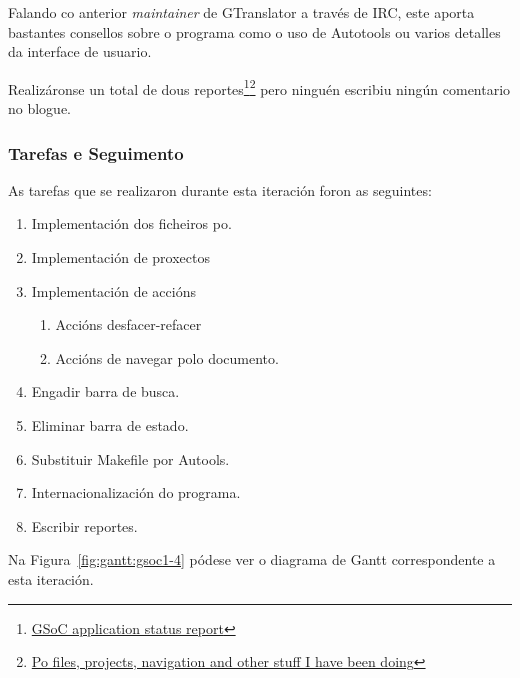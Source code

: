 Falando co anterior \emph{maintainer} de GTranslator a través de IRC, este aporta bastantes consellos sobre o programa como o uso de Autotools ou varios detalles da interface de usuario.

Realizáronse un total de dous reportes\footnote{\href{http://aquelando.info/gsoc-application-status-report/}{GSoC application status report}}\footnote{\href{http://aquelando.info/po-files-projects-navigation-and-other-stuff-i-have-been-doing/}{Po files, projects, navigation and other stuff I have been doing}} pero ninguén escribiu ningún comentario no blogue.

\subsubsection{Tarefas e Seguimento}

As tarefas que se realizaron durante esta iteración foron as seguintes:

\begin{enumerate}[label=\bfseries WBS 4.\arabic*]
  \item Implementación dos ficheiros po.
  \item Implementación de proxectos
  \item Implementación de accións
    \begin{enumerate}[label=\bfseries WBS 4.3.\arabic*]
      \item Accións desfacer-refacer
      \item Accións de navegar polo documento.
    \end{enumerate}
  \item Engadir barra de busca.
  \item Eliminar barra de estado.
  \item Substituir Makefile por Autools.
  \item Internacionalización do programa.
  \item Escribir reportes.
\end {enumerate}

Na Figura~\ref{fig:gantt:gsoc1-4} pódese ver o diagrama de Gantt correspondente a esta iteración.


